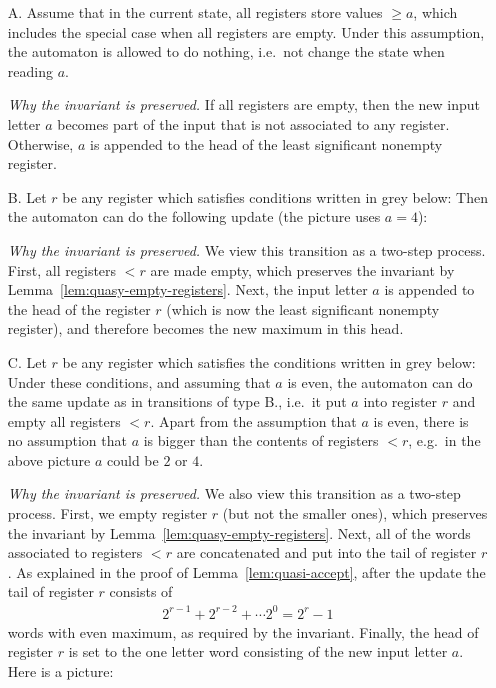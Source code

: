 \begin{enumerate}
\item[A.] Assume that in the current state, all registers store values $\ge a$, which includes the special case when all registers are empty. Under this assumption, the automaton is allowed to do nothing, i.e.~not change the state when reading $a$.

\emph{Why the invariant is preserved.} If all registers are empty, then the new input letter $a$ becomes part of the input that is not associated to any register. Otherwise, $a$ is appended to the head of the least significant nonempty register.  


	\item[B.] Let  $r$ be any register  which satisfies conditions written in grey below:
 Then the automaton can do the following update (the picture uses $a=4$):
 
 \emph{Why the invariant is preserved.} We view this transition as a two-step process. First, all registers $< r$ are made empty, which preserves the invariant by Lemma~\ref{lem:quasy-empty-registers}. Next, the input letter $a$ is appended to the head of the register $r$ (which is now the least significant nonempty register), and therefore becomes the new maximum in this head.
		\item[C.] Let  $r$ be any register  which satisfies the conditions written in grey below:
Under these conditions, and assuming that $a$ is even, the automaton can do the same update as in transitions of type B., i.e.~it put $a$ into register $r$ and empty all registers $<r$. Apart from the assumption that $a$ is even, there is no assumption that $a$ is bigger than the contents of registers $< r$, e.g.~in the above picture $a$ could be $2$ or $4$.
 
  \emph{Why the invariant is preserved.} We also view this transition as a two-step process. First, we empty register $r$ (but not the smaller ones), which preserves the invariant by Lemma~\ref{lem:quasy-empty-registers}.   Next, all of the words associated to registers $<r$ are concatenated and put into the tail of register $r$. As explained in the proof of Lemma~\ref{lem:quasi-accept}, after the update the  tail of register $r$ consists of 
 \begin{align*}
2^{r-1}+2^{r-2}+ \cdots 2^0 = 2^{r} -1  
\end{align*}
words with even maximum, as required by the invariant. Finally,  the head of register $r$ is set to the one letter word consisting of the new input letter $a$.  Here is a  picture: 
\end{enumerate}




